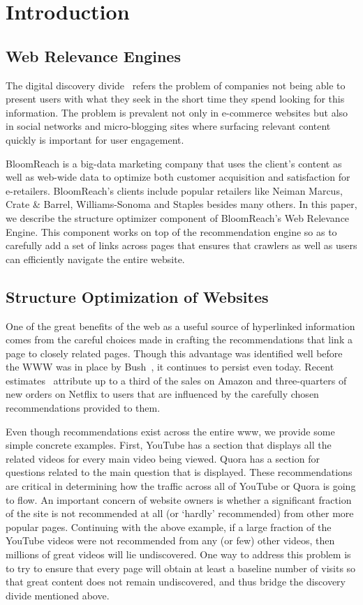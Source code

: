 \section{Introduction}

\subsection{Web Relevance Engines}
The digital discovery divide~\cite{WebRelevanceEngine} refers the problem of companies not being able to present users with what they seek in the short time they spend looking for this information.
The problem is prevalent not only in e-commerce websites but also in social networks and micro-blogging sites where surfacing relevant content quickly is important for user engagement.

BloomReach is a big-data marketing company that uses the client's content as well as web-wide data to optimize both customer acquisition and satisfaction for e-retailers.
BloomReach's clients include popular retailers like Neiman Marcus, Crate \& Barrel, Williams-Sonoma and Staples besides many others. In this paper, we describe the structure optimizer component of BloomReach's Web Relevance Engine.
This component works on top of the recommendation engine so as to carefully add a set of links across pages that ensures that crawlers as well as users can efficiently navigate the entire website.

\subsection{Structure Optimization of Websites}

One of the great benefits of the web as a useful source of hyperlinked
information comes from the careful choices made in crafting the
recommendations that link a page to closely related pages. Though this
advantage was identified well before the WWW was in place by
Bush~\cite{Bush45aswe}, it continues to persist even today.
Recent estimates~\cite{big-data-book13} attribute up to a third of the sales
on Amazon and three-quarters of new orders on Netflix to users that are
influenced by the carefully chosen recommendations provided to them.

Even though recommendations exist across the entire www, we provide some simple concrete examples. First, YouTube has a section that displays all the related videos for every main video being viewed.
Quora has a section for questions related to the main question that is displayed. These recommendations are critical in determining how the traffic across all of YouTube or Quora is going to flow.
An important concern of website owners is whether a significant fraction of the site is not recommended at all (or `hardly' recommended) from other more popular pages. Continuing
with the above example, if a large fraction of the YouTube videos were not recommended from any (or few) other videos, then millions of great videos will lie undiscovered. One way to address this
problem is to try to ensure that every page will obtain at least a baseline number of visits so that great content does not remain undiscovered, and thus bridge the discovery divide mentioned above.

